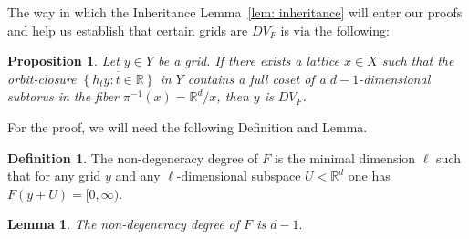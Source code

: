 \documentclass[reqno,11pt, twoside]{amsart}
\theoremstyle{plain}
\newtheorem{lem}[thm]{Lemma}
\newtheorem{prop}[thm]{Proposition}
\theoremstyle{definition}
\newtheorem{defn}[thm]{Definition}
\theoremstyle{definition}
\theoremstyle{remark}
\numberwithin{equation}{section}
\newcommand{\bR}{\mathbb{R}}
\newcommand\seta[1]{\left\{#1\right\}}
\begin{document}
The way in which the Inheritance Lemma~\ref{lem: inheritance} will enter our proofs and help us establish that certain grids are $DV_F$ is via the following:
\begin{prop}\label{prop: codimension 1 subtorus}
    Let $y\in Y$ be a grid. If there exists a lattice $x\in X$ such that 
    the orbit-closure $\overline{\seta{h_ty:t\in\bR}}$ in $Y$ contains
    a full coset of a $d-1$-dimensional subtorus in the fiber 
    $\pi^{-1}(x) = \bR^d/x$, then $y$ is $DV_F$.
\end{prop}
For the proof, we will need the following Definition and Lemma.
\begin{defn}\label{defn: non degeneracy degree}
    The non-degeneracy degree of $F$ is the minimal dimension $\ell$ such that for any grid $y$ and any $\ell$-dimensional subspace $U<\bR^d$ one has $F(y+U)=[0,\infty).$
\end{defn}
\begin{lem}\label{lem: non degeneracy degree}
    The non-degeneracy degree of $F$ is $d-1.$ 
\end{lem}
\end{document}
